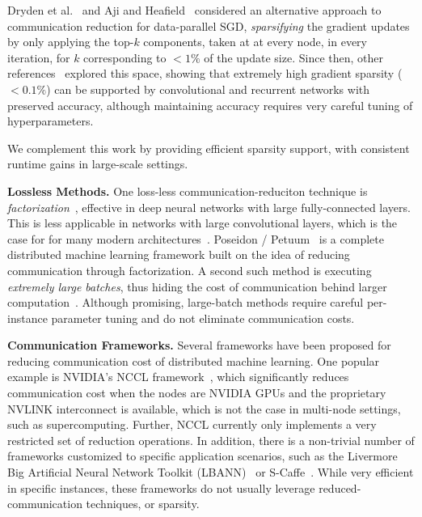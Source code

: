 \documentclass[11pt]{article}
\renewcommand{\paragraph}[1]{\vspace{0.1em} \noindent \textbf{#1}}
\begin{document}
Dryden et al.~\cite{dryden2016communication} and Aji and Heafield~\cite{aji2017sparse} considered an alternative approach to communication reduction for data-parallel SGD, \emph{sparsifying} the gradient updates by only applying the top-$k$ components, taken at at every node, in every iteration, for $k$ corresponding to $<1\%$ of the update size. Since then, other references~\cite{sun2017meprop, lin2017deep} explored this space, showing that extremely high gradient sparsity ($<0.1\%$) can be supported by convolutional and recurrent networks with preserved accuracy, although maintaining accuracy requires very careful tuning of hyperparameters. 

We complement this work by providing  efficient sparsity support, with consistent runtime gains in large-scale settings. 

\paragraph{Lossless Methods.} One loss-less communication-reduciton technique is \emph{factorization}~\cite{chilimbi2014project, xing2015petuum}, effective in deep neural networks with large fully-connected layers. This is less applicable in networks with large convolutional layers, which is the case for for many modern architectures~\cite{he2016deep, szegedy2017inception}. Poseidon / Petuum~\cite{xing2015petuum} is a complete distributed machine learning framework built on the idea of reducing communication through factorization. 
A second such method is executing \emph{extremely large batches}, thus hiding the cost of communication behind larger computation~\cite{goyal2017accurate, you2017scaling}. 
Although promising, large-batch methods require careful per-instance parameter tuning and do not eliminate communication costs. 

\paragraph{Communication Frameworks.} Several frameworks have been proposed for reducing communication cost of distributed machine learning. 
One popular example is NVIDIA's NCCL framework~\cite{NCCL}, which significantly reduces communication cost when the nodes are NVIDIA GPUs and the proprietary NVLINK interconnect is available, which is not the case in multi-node settings, such as supercomputing. Further, NCCL currently only implements a very restricted set of reduction operations.
In addition, there is a non-trivial number of frameworks customized to specific application scenarios, such as the Livermore Big Artificial Neural Network Toolkit (LBANN)~\cite{van2015lbann} or S-Caffe~\cite{awan2017s}.
While very efficient in specific instances, these frameworks do not usually leverage reduced-communication techniques, or sparsity. 
\end{document}
